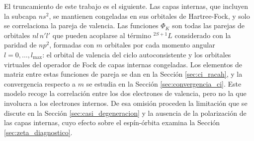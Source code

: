 El truncamiento de este trabajo es el siguiente. Las capas internas, que incluyen la subcapa $ns^2$, se mantienen congeladas en sus orbitales de Hartree-Fock, y solo se correlaciona la pareja de valencia. Las funciones $\Phi_K$ son todas las parejas de orbitales $nl\,n'l'$ que pueden acoplarse al término $^{2S+1}L$ considerado con la paridad de $np^2$, formadas con $m$ orbitales por cada momento angular $l = 0, \dots, l_{\max}$: el orbital de valencia del ciclo autoconsistente y los orbitales virtuales del operador de Fock de capas internas congeladas. Los elementos de matriz entre estas funciones de pareja se dan en la Sección \ref{sec:ci_racah}, y la convergencia respecto a $m$ se estudia en la Sección \ref{sec:convergencia_ci}. Este modelo recoge la correlación entre los dos electrones de valencia, pero no la que involucra a los electrones internos. De esa omisión proceden la limitación que se discute en la Sección \ref{sec:casi_degeneracion} y la ausencia de la polarización de las capas internas, cuyo efecto sobre el espín-órbita examina la Sección \ref{sec:zeta_diagnostico}.

